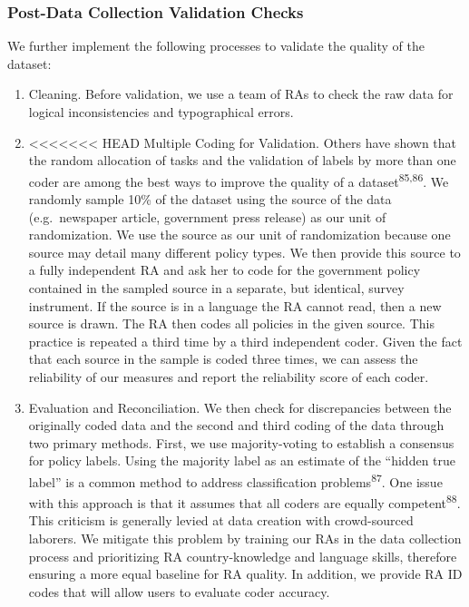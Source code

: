 \documentclass[]{article}
\begin{document}
\hypertarget{post-data-collection-validation-checks}{%
\subsubsection*{Post-Data Collection Validation Checks}\label{post-data-collection-validation-checks}}

We further implement the following processes to validate the quality of the dataset:

\begin{enumerate}
\def\labelenumi{\arabic{enumi}.}
\item
  Cleaning. Before validation, we use a team of RAs to check the raw data for logical inconsistencies and typographical errors.
\item
<<<<<<< HEAD
  Multiple Coding for Validation. Others have shown that the random allocation of tasks and the validation of labels by more than one coder are among the best ways to improve the quality of a dataset\textsuperscript{85,86}. We randomly sample 10\% of the dataset using the source of the data (e.g.~newspaper article, government press release) as our unit of randomization. We use the source as our unit of randomization because one source may detail many different policy types. We then provide this source to a fully independent RA and ask her to code for the government policy contained in the sampled source in a separate, but identical, survey instrument. If the source is in a language the RA cannot read, then a new source is drawn. The RA then codes all policies in the given source. This practice is repeated a third time by a third independent coder. Given the fact that each source in the sample is coded three times, we can assess the reliability of our measures and report the reliability score of each coder.
\item
  Evaluation and Reconciliation. We then check for discrepancies between the originally coded data and the second and third coding of the data through two primary methods. First, we use majority-voting to establish a consensus for policy labels. Using the majority label as an estimate of the ``hidden true label'' is a common method to address classification problems\textsuperscript{87}. One issue with this approach is that it assumes that all coders are equally competent\textsuperscript{88}. This criticism is generally levied at data creation with crowd-sourced laborers. We mitigate this problem by training our RAs in the data collection process and prioritizing RA country-knowledge and language skills, therefore ensuring a more equal baseline for RA quality. In addition, we provide RA ID codes that will allow users to evaluate coder accuracy.

\end{enumerate}
\end{document}
